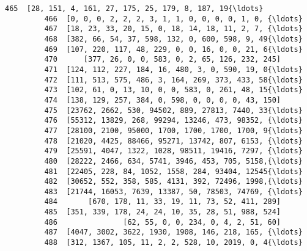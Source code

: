 \documentclass[11pt]{article}
\begin{document}
\begin{Verbatim}[commandchars=\\\{\}]
         465  [28, 151, 4, 161, 27, 175, 25, 179, 8, 187, 19{\ldots}   
         466  [0, 0, 0, 2, 2, 2, 3, 1, 1, 0, 0, 0, 0, 1, 0, {\ldots}   
         467  [18, 23, 33, 20, 15, 0, 18, 14, 18, 11, 2, 7, {\ldots}   
         468  [382, 66, 54, 37, 598, 132, 0, 600, 598, 9, 49{\ldots}   
         469  [107, 220, 117, 48, 229, 0, 0, 16, 0, 0, 21, 6{\ldots}   
         470      [377, 26, 0, 0, 583, 0, 2, 65, 126, 232, 245]   
         471  [124, 112, 227, 184, 16, 480, 3, 0, 590, 19, 0{\ldots}   
         472  [111, 513, 575, 486, 3, 164, 269, 373, 433, 58{\ldots}   
         473  [102, 61, 0, 13, 10, 0, 0, 583, 0, 261, 48, 15{\ldots}   
         474  [138, 129, 257, 384, 0, 598, 0, 0, 0, 0, 43, 150]   
         475  [23762, 2662, 530, 94502, 889, 27813, 7440, 33{\ldots}   
         476  [55312, 13829, 268, 99294, 13246, 473, 98352, {\ldots}   
         477  [28100, 2100, 95000, 1700, 1700, 1700, 1700, 9{\ldots}   
         478  [21020, 4425, 88466, 95271, 13742, 807, 6153, {\ldots}   
         479  [25591, 4047, 1322, 1028, 98511, 19416, 7297, {\ldots}   
         480  [28222, 2466, 634, 5741, 3946, 453, 705, 5158,{\ldots}   
         481  [22405, 228, 84, 1052, 1558, 284, 93404, 12545{\ldots}   
         482  [30652, 552, 358, 585, 4131, 392, 72496, 1998,{\ldots}   
         483  [21744, 16053, 7639, 13387, 50, 78503, 74769, {\ldots}   
         484       [670, 178, 11, 33, 19, 11, 73, 52, 411, 289]   
         485  [351, 339, 178, 24, 24, 10, 35, 28, 51, 988, 524]   
         486               [62, 55, 0, 0, 234, 0, 4, 2, 51, 60]   
         487  [4047, 3002, 3622, 1930, 1908, 146, 218, 165, {\ldots}   
         488  [312, 1367, 105, 11, 2, 2, 528, 10, 2019, 0, 4{\ldots}   
         

\end{Verbatim}
\end{document}
